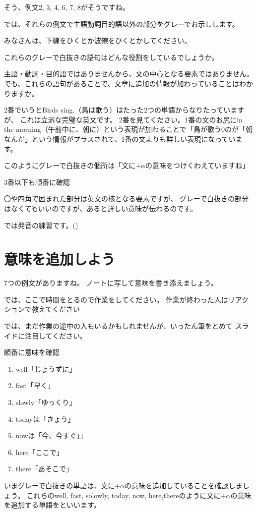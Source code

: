 \documentclass[book,jafontscale=0.9247]{jlreq}
\newcommand{\mySagyo}{%
\par%
\bigskip
では、ここで時間をとるので作業をしてください。
作業が終わった人はリアクションで教えてください\par%
\begin{minipage}[t]{.98\textwidth}
\mbox{}\hrulefill\mbox{}\par%
\mbox{}\hfill{}\raisebox{-.5\height}{作業}\hfill\mbox{}\par%
\mbox{}\hrulefill\mbox{}
\end{minipage}%
\par%
\bigskip%
では、まだ作業の途中の人もいるかもしれませんが、いったん筆をとめて
スライドに注目してください。%
\par%
\bigskip
}
\begin{document}
そう、例文2, 3, 4, 6, 7, 8がそうですね。

では、それらの例文で主語動詞目的語以外の部分をグレーでお示しします。

みなさんは、下線をひくとか波線をひくとかしてください。

これらのグレーで白抜きの語句はどんな役割をしているでしょうか。

主語・動詞・目的語ではありませんから、文の中心となる要素ではありません。
でも、これらの語句があることで、文章に追加の情報が加わっていることはわかりますか。

2番でいうとBirds sing.（鳥は歌う）はたった2つの単語からなりたっていますが、
これは立派な完璧な英文です。
2番を見てください。1番の文のお尻にin the morning（午前中に、朝に）という表現が加わることで「鳥が歌う0のが「朝なんだ」という情報がプラスされて、1番の文よりも詳しい表現になっています。

このようにグレーで白抜きの個所は「文に$+\alpha$の意味をつけくわえていますね」

3番以下も順番に確認

〇や四角で囲まれた部分は英文の核となる要素ですが、
グレーで白抜きの部分はなくてもいいのですが、あると詳しい意味が伝わるのです。

では発音の練習です。()

\section{意味を追加しよう}

7つの例文がありますね。
ノートに写して意味を書き添えましょう。

\mySagyo

順番に意味を確認
\begin{enumerate}
 \item well「じょうずに」
 \item fast「早く」
 \item slowly「ゆっくり」
 \item todayは「きょう」
 \item nowは「今、今すぐ」」
 \item here「ここで」
 \item there「あそこで」
\end{enumerate}

いまグレーで白抜きの単語は、文に$+\alpha$の意味を追加していることを確認しましょう。
これらのwell, fast, solowly, today, now, here,thereのように文に$+\alpha$の意味を追加する単語をといいます。
\end{document}
